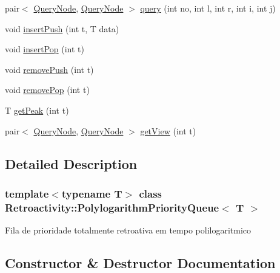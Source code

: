 \begin{DoxyCompactItemize}
\item 
pair$<$ \hyperlink{classRetroactivity_1_1PolylogarithmPriorityQueue_1_1QueryNode}{Query\+Node}, \hyperlink{classRetroactivity_1_1PolylogarithmPriorityQueue_1_1QueryNode}{Query\+Node} $>$ \hyperlink{classRetroactivity_1_1PolylogarithmPriorityQueue_a464b4358858dcf25a9d4b2c4b3893218}{query} (int no, int l, int r, int i, int j)
\item 
void \hyperlink{classRetroactivity_1_1PolylogarithmPriorityQueue_aa93c676dc292c42fc528ade916476b77}{insert\+Push} (int t, T data)
\item 
void \hyperlink{classRetroactivity_1_1PolylogarithmPriorityQueue_a67192a84402c55ac9d1ed46b424e5bd9}{insert\+Pop} (int t)
\item 
void \hyperlink{classRetroactivity_1_1PolylogarithmPriorityQueue_ad19cb99726304b5b47213f28e23d24fc}{remove\+Push} (int t)
\item 
void \hyperlink{classRetroactivity_1_1PolylogarithmPriorityQueue_acd4a4c7183bcc14a5532818fc772c08b}{remove\+Pop} (int t)
\item 
T \hyperlink{classRetroactivity_1_1PolylogarithmPriorityQueue_ab1473c2314768fd86a727cca9507121b}{get\+Peak} (int t)
\item 
pair$<$ \hyperlink{classRetroactivity_1_1PolylogarithmPriorityQueue_1_1QueryNode}{Query\+Node}, \hyperlink{classRetroactivity_1_1PolylogarithmPriorityQueue_1_1QueryNode}{Query\+Node} $>$ \hyperlink{classRetroactivity_1_1PolylogarithmPriorityQueue_a63c8782f290dd5ae66259401dcbf8e40}{get\+View} (int t)
\end{DoxyCompactItemize}


\subsection{Detailed Description}
\subsubsection*{template$<$typename T$>$\newline
class Retroactivity\+::\+Polylogarithm\+Priority\+Queue$<$ T $>$}

Fila de prioridade totalmente retroativa em tempo polilogaritmico 

\subsection{Constructor \& Destructor Documentation}
\mbox{\label{classRetroactivity_1_1PolylogarithmPriorityQueue_ab925447d20c941a8f126d20c267052da}} 
